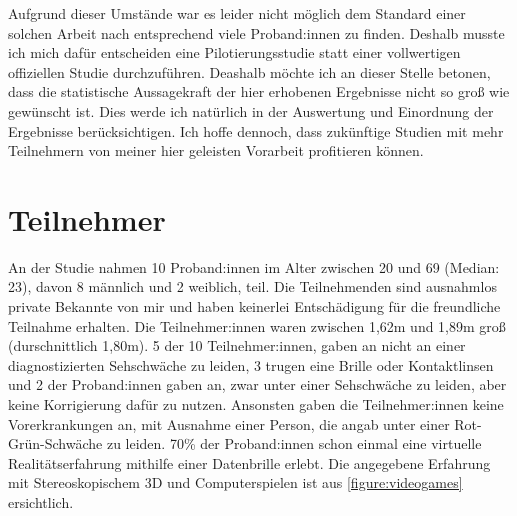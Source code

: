         Aufgrund dieser Umstände war es leider nicht möglich dem Standard einer solchen Arbeit nach entsprechend viele Proband:innen zu finden. Deshalb musste ich mich dafür entscheiden eine Pilotierungsstudie statt einer vollwertigen offiziellen Studie durchzuführen. Deashalb möchte ich an dieser Stelle betonen, dass die statistische Aussagekraft der hier erhobenen Ergebnisse nicht so groß wie gewünscht ist. Dies werde ich natürlich in der Auswertung und Einordnung der Ergebnisse berücksichtigen. Ich hoffe dennoch, dass zukünftige Studien mit mehr Teilnehmern von meiner hier geleisten Vorarbeit profitieren können.

    \section{Teilnehmer}\label{sec:participants}
        An der Studie nahmen 10 Proband:innen im Alter zwischen 20 und 69 (Median: 23), davon 8 männlich und 2 weiblich, teil. Die Teilnehmenden sind ausnahmlos private Bekannte von mir und haben keinerlei Entschädigung für die freundliche Teilnahme erhalten.
        Die Teilnehmer:innen waren zwischen 1,62m und 1,89m groß (durschnittlich 1,80m).
        5 der 10 Teilnehmer:innen, gaben an nicht an einer diagnostizierten Sehschwäche zu leiden, 3 trugen eine Brille oder Kontaktlinsen und 2 der Proband:innen gaben an, zwar unter einer Sehschwäche zu leiden, aber keine Korrigierung dafür zu nutzen. Ansonsten gaben die Teilnehmer:innen keine Vorerkrankungen an, mit Ausnahme einer Person, die angab unter einer Rot-Grün-Schwäche zu leiden.
        70\% der Proband:innen schon einmal eine virtuelle Realitätserfahrung mithilfe einer Datenbrille erlebt. Die angegebene Erfahrung mit Stereoskopischem 3D und Computerspielen ist aus \autoref{figure:videogames} ersichtlich.

